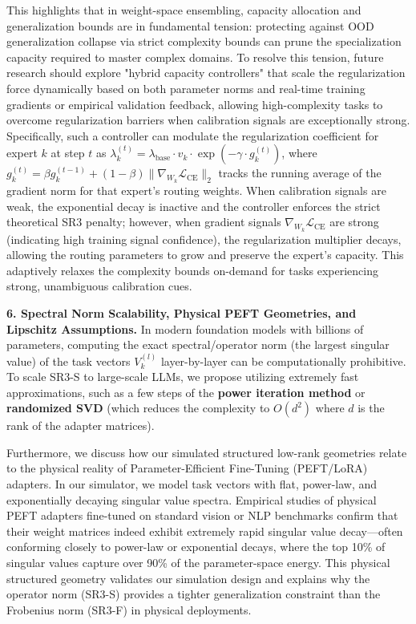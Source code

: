 This highlights that in weight-space ensembling, capacity allocation and generalization bounds are in fundamental tension: protecting against OOD generalization collapse via strict complexity bounds can prune the specialization capacity required to master complex domains. To resolve this tension, future research should explore "hybrid capacity controllers" that scale the regularization force dynamically based on both parameter norms and real-time training gradients or empirical validation feedback, allowing high-complexity tasks to overcome regularization barriers when calibration signals are exceptionally strong. Specifically, such a controller can modulate the regularization coefficient for expert $k$ at step $t$ as $\lambda_k^{(t)} = \lambda_{\text{base}} \cdot v_k \cdot \exp(-\gamma \cdot g_k^{(t)})$, where $g_k^{(t)} = \beta g_k^{(t-1)} + (1-\beta) \|\nabla_{W_k} \mathcal{L}_{\text{CE}}\|_2$ tracks the running average of the gradient norm for that expert's routing weights. When calibration signals are weak, the exponential decay is inactive and the controller enforces the strict theoretical SR3 penalty; however, when gradient signals $\nabla_{W_k} \mathcal{L}_{\text{CE}}$ are strong (indicating high training signal confidence), the regularization multiplier decays, allowing the routing parameters to grow and preserve the expert's capacity. This adaptively relaxes the complexity bounds on-demand for tasks experiencing strong, unambiguous calibration cues.

\textbf{6. Spectral Norm Scalability, Physical PEFT Geometries, and Lipschitz Assumptions.}
In modern foundation models with billions of parameters, computing the exact spectral/operator norm (the largest singular value) of the task vectors $V_k^{(l)}$ layer-by-layer can be computationally prohibitive. To scale SR3-S to large-scale LLMs, we propose utilizing extremely fast approximations, such as a few steps of the \textbf{power iteration method} or \textbf{randomized SVD} (which reduces the complexity to $O(d^2)$ where $d$ is the rank of the adapter matrices).

Furthermore, we discuss how our simulated structured low-rank geometries relate to the physical reality of Parameter-Efficient Fine-Tuning (PEFT/LoRA) adapters. In our simulator, we model task vectors with flat, power-law, and exponentially decaying singular value spectra. Empirical studies of physical PEFT adapters fine-tuned on standard vision or NLP benchmarks confirm that their weight matrices indeed exhibit extremely rapid singular value decay—often conforming closely to power-law or exponential decays, where the top 10\% of singular values capture over 90\% of the parameter-space energy. This physical structured geometry validates our simulation design and explains why the operator norm (SR3-S) provides a tighter generalization constraint than the Frobenius norm (SR3-F) in physical deployments.

